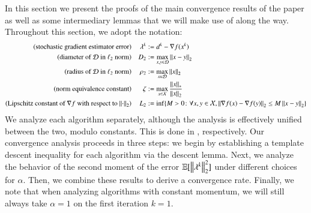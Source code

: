 \begin{toappendix}
\label{app:analysis}
In this section we present the proofs of the main convergence results of the paper as well as some intermediary lemmas that we will make use of along the way. Throughout this section, we adopt the notation:
\begin{align*}
\text{(stochastic gradient estimator error)} && \lambda^k &:= d^k-\nabla f(x^k) \\
\text{(diameter of $\mathcal{D}$ in $\ell_2$ norm)} && D_2 &:= \max_{x,y\in\mathcal{D}}\left\Vert{x-y}\right\Vert_2 \\
\text{(radius of $\mathcal{D}$ in $\ell_2$ norm)} && \rho_2 &:= \max_{x\in\mathcal{D}}\left\Vert{x}\right\Vert_2 \\
\text{(norm equivalence constant)} && \zeta &:= \max_{x\in\mathcal{X}}\frac{\left\Vert{x}\right\Vert_{\ast}}{\left\Vert{x}\right\Vert_2} \\
\text{(Lipschitz constant of $\nabla f$ with respect to $\left\Vert{\cdot}\right\Vert_{2}$)} && L_2 &:= \inf \{M>0\colon \forall x,y\in\mathcal{X}, \left\Vert{\nabla f(x)-\nabla f(y)}\right\Vert_{2}\leq M\left\Vert{x-y}\right\Vert_{2}\}
\end{align*}
We analyze each algorithm separately, although the analysis is effectively unified between the two, modulo constants. This is done in , respectively. Our convergence analysis proceeds in three steps: we begin by establishing a template descent inequality for each algorithm via the descent lemma. Next, we analyze the behavior of the second moment of the error $\mathbb{E}[\left\Vert{\lambda^k}\right\Vert_{2}^2]$ under different choices for $\alpha$. Then, we combine these results to derive a convergence rate. Finally, we note that when analyzing algorithms with constant momentum, we will still always take $\alpha=1$ on the first iteration $k=1$.


\end{toappendix}
